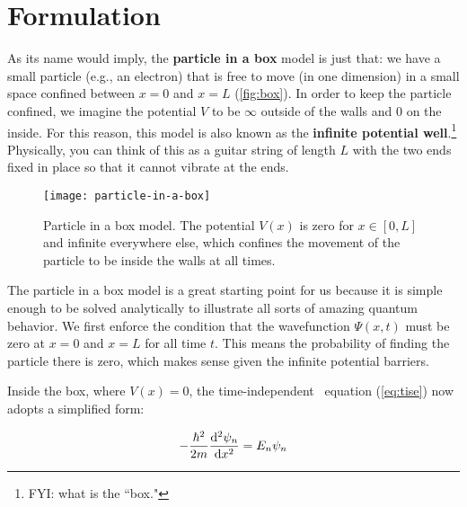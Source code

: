 \section{Formulation}

As its name would imply, the \textbf{particle in a box} model is just that: we have a small particle (e.g., an electron) that is free to move (in one dimension) in a small space confined between $x = 0$ and $x = L$ (\autoref{fig:box}). 
In order to keep the particle confined, we imagine the potential $V$ to be $\infty$ outside of the walls and 0 on the inside. 
For this reason, this model is also known as the \textbf{infinite potential well}.\footnote{FYI: what is the ``box."}
Physically, you can think of this as a guitar string of length $L$ with the two ends fixed in place so that it cannot vibrate at the ends.

\begin{figure}[!h]
	\centering
	\texttt{[image: particle-in-a-box]}
	\caption{Particle in a box model. 
		The potential $V(x)$ is zero for $x \in [0,L]$ and infinite everywhere else, which confines the movement of the particle to be inside the walls at all times.}
	\label{fig:box}
\end{figure}

The particle in a box model is a great starting point for us because it is simple enough to be solved analytically to illustrate all sorts of amazing quantum behavior. 
We first enforce the condition that the wavefunction $\Psi(x,t)$ must be zero at $x = 0$ and $x = L$ for all time $t$. 
This means the probability of finding the particle there is zero, which makes sense given the infinite potential barriers.

Inside the box, where $V(x) = 0$, the time-independent \Sch\ equation (\autoref{eq:tise}) now adopts a simplified form:

\begin{tcolorbox}[title=\Sch\ equation for particle in a box] \vspace{-2ex}
	\begin{equation}
		-\frac{\hbar^2}{2m} \dv[2]{\psi_n}{x} = E_n\psi_n  \label{eq:box-se}
	\end{equation}
\end{tcolorbox}

